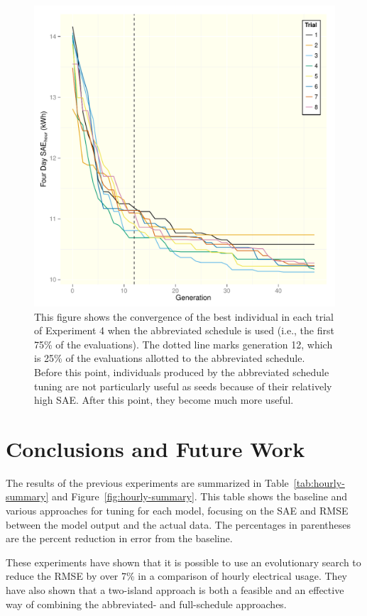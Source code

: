 \documentclass[preprint, review, 12pt]{elsarticle}
\begin{document}
\begin{figure}[htbp]
\centering
\includegraphics[width=5in]{graphics/figure2.pdf}
\caption{This figure shows the convergence of the best individual in each trial of Experiment 4 when the abbreviated schedule is used (i.e., the first 75\% of the evaluations). The dotted line marks generation 12, which is 25\% of the evaluations allotted to the abbreviated schedule. Before this point, individuals produced by the abbreviated schedule tuning are not particularly useful as seeds because of their relatively high SAE. After this point, they become much more useful.}
\label{fig:hour-converge}
\end{figure}


\section{Conclusions and Future Work}
\label{sec:conclusions}
The results of the previous experiments are summarized in Table~\ref{tab:hourly-summary} and Figure~\ref{fig:hourly-summary}. This table shows the baseline and various approaches for tuning for each model, focusing on the SAE and RMSE between the model output and the actual data. The percentages in parentheses are the percent reduction in error from the baseline.

These experiments have shown that it is possible to use an evolutionary search to reduce the RMSE by over 7\% in a  comparison of hourly electrical usage. They have also shown that a two-island approach is both a feasible and an effective way of combining the abbreviated- and full-schedule approaches. 
\end{document}
